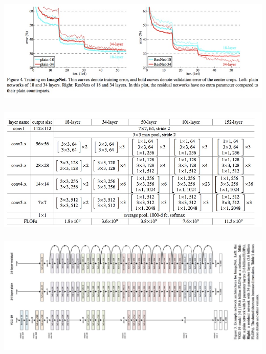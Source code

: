 \documentclass[xetex,mathserif,serif,aspectratio=169]{beamer}
\begin{document}
\begin{frame}[fragile] \frametitle{} \oldB \small

\begin{center}
\includegraphics[width=\textwidth]{img/resNetPerform.jpg}
\end{center}

\end{frame}


\begin{frame}[fragile] \frametitle{} \oldB \small

\begin{center}
\includegraphics[width=\textwidth]{img/resNetModel.jpg}
\end{center}

\end{frame}

\begin{frame}[fragile] \frametitle{} \oldB \small

\begin{center}
\includegraphics[width=\textwidth]{img/resNet.jpg}
\end{center}

\end{frame}
\end{document}
